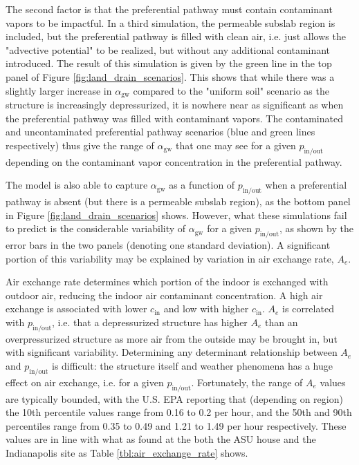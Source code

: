 \documentclass[journal=esthag,manuscript=article]{achemso}
\begin{document}
The second factor is that the preferential pathway must contain contaminant vapors to be impactful.
In a third simulation, the permeable subslab region is included, but the preferential pathway is filled with clean air, i.e. just allows the "advective potential" to be realized, but without any additional contaminant introduced.
The result of this simulation is given by the green line in the top panel of Figure \ref{fig:land_drain_scenarios}.
This shows that while there was a slightly larger increase in $\alpha_\mathrm{gw}$ compared to the "uniform soil" scenario as the structure is increasingly depressurized, it is nowhere near as significant as when the preferential pathway was filled with contaminant vapors.
The contaminated and uncontaminated preferential pathway scenarios (blue and green lines respectively) thus give the range of $\alpha_\mathrm{gw}$ that one may see for a given $p_\mathrm{in/out}$ depending on the contaminant vapor concentration in the preferential pathway.

The model is also able to capture $\alpha_\mathrm{gw}$ as a function of $p_\mathrm{in/out}$ when a preferential pathway is absent (but there is a permeable subslab region), as the bottom panel in Figure \ref{fig:land_drain_scenarios} shows.
However, what these simulations fail to predict is the considerable variability of $\alpha_\mathrm{gw}$ for a given $p_\mathrm{in/out}$, as shown by the error bars in the two panels (denoting one standard deviation).
A significant portion of this variability may be explained by variation in air exchange rate, $A_e$.

Air exchange rate determines which portion of the indoor is exchanged with outdoor air, reducing the indoor air contaminant concentration.
A high air exchange is associated with lower $c_\mathrm{in}$ and low with higher $c_\mathrm{in}$.
$A_e$ is correlated with $p_\mathrm{in/out}$, i.e. that a depressurized structure has higher $A_e$ than an overpressurized structure as more air from the outside may be brought in, but with significant variability.
Determining any determinant relationship between $A_e$ and $p_\mathrm{in/out}$ is difficult: the structure itself and weather phenomena has a huge effect on air exchange, i.e. for a given $p_\mathrm{in/out}$.
Fortunately, the range of $A_e$ values are typically bounded, with the U.S. EPA reporting that (depending on region) the 10th percentile values range from 0.16 to 0.2 per hour, and the 50th and 90th percentiles range from 0.35 to 0.49 and 1.21 to 1.49 per hour respectively\cite{u.s._epa_exposure_2011,m._d._koontz_estimation_1995}.
These values are in line with what as found at the both the ASU house and the Indianapolis site as Table \ref{tbl:air_exchange_rate} shows.
\end{document}
